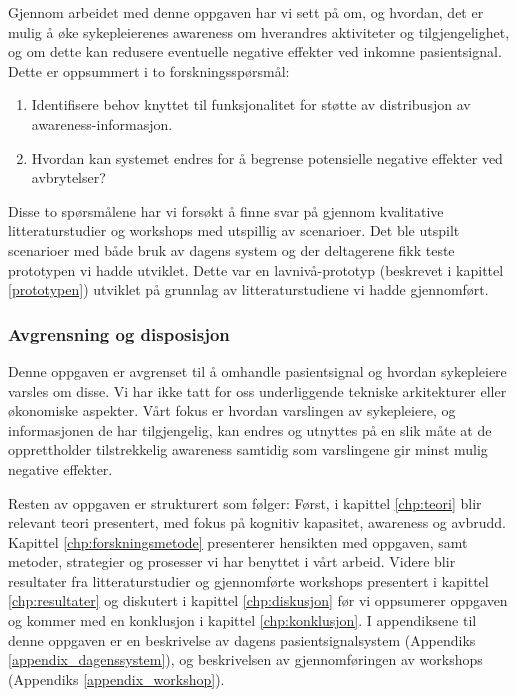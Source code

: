 \noindent
Gjennom arbeidet med denne oppgaven har vi sett på om, og hvordan, det er mulig å øke sykepleierenes awareness om hverandres aktiviteter og tilgjengelighet, og om dette kan redusere eventuelle negative effekter ved inkomne pasientsignal. Dette er oppsummert i to forskningsspørsmål:

\begin{enumerate}
  \item Identifisere behov knyttet til funksjonalitet for støtte av distribusjon av awareness-informasjon.
  \item Hvordan kan systemet endres for å begrense potensielle negative effekter ved avbrytelser?
\end{enumerate}

\noindent
Disse to spørsmålene har vi forsøkt å finne svar på gjennom kvalitative litteraturstudier og workshops med utspillig av scenarioer. Det ble utspilt scenarioer med både bruk av dagens system og der deltagerene fikk teste prototypen vi hadde utviklet. Dette var en lavnivå-prototyp (beskrevet i kapittel \ref{prototypen}) utviklet på grunnlag av litteraturstudiene vi hadde gjennomført.

\subsubsection{Avgrensning og disposisjon}
Denne oppgaven er avgrenset til å omhandle pasientsignal og hvordan sykepleiere varsles om disse. Vi har ikke tatt for oss underliggende tekniske arkitekturer eller økonomiske aspekter. Vårt fokus er hvordan varslingen av sykepleiere, og informasjonen de har tilgjengelig, kan endres og utnyttes på en slik måte at de opprettholder tilstrekkelig awareness samtidig som varslingene gir minst mulig negative effekter.

\noindent
Resten av oppgaven er strukturert som følger: Først, i kapittel \ref{chp:teori} blir relevant teori presentert, med fokus på kognitiv kapasitet, awareness og avbrudd. Kapittel \ref{chp:forskningsmetode} presenterer hensikten med oppgaven, samt metoder, strategier og prosesser vi har benyttet i vårt arbeid. Videre blir resultater fra litteraturstudier og gjennomførte workshops presentert i kapittel \ref{chp:resultater} og diskutert i kapittel \ref{chp:diskusjon} før vi oppsumerer oppgaven og kommer med en konklusjon i kapittel \ref{chp:konklusjon}. I appendiksene til denne oppgaven er en beskrivelse av dagens pasientsignalsystem (Appendiks \ref{appendix_dagenssystem}), og beskrivelsen av gjennomføringen av workshops (Appendiks \ref{appendix_workshop}).